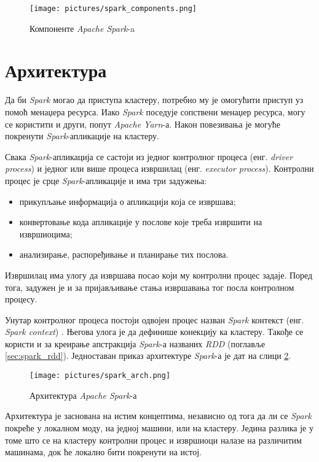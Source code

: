 \documentclass[12pt,oneside]{memoir}
\begin{document}
\begin{figure}[!ht]
  \centering
  \texttt{[image: pictures/spark\_components.png]}
  \caption{Компоненте \textit{Apache Spark}-a}
  \label{fig:spark_kompot}
\end{figure}

\section{Архитектура}
\label{sec:spark_arx}

Да би \textit{Spark} могао да приступа кластеру, потребно му је омогућити приступ уз помоћ менаџера ресурса. Иако \textit{Spark} поседује сопствени менаџер ресурса, могу се користити и други, попут \textit{Apache Yarn}-а. Након повезивања је могуће покренути \textit{Spark}-апликације на кластеру. 

Свака \textit{Spark}-апликација се састоји из једног контролног процеса (енг. \textit{driver process}) и једног или више процеса извршилац (енг. \textit{executor process}). Контролни процес је срце \textit{Spark}-апликације и има три задужења:

\begin{itemize}
	\item прикупљање информација о апликацији која се извршава;	
	\item конвертовање кода апликације у послове које треба извршити на извршиоцима;
	\item анализирање, распоређивање и планирање тих послова.
\end{itemize}

Извршилац има улогу да извршава посао који му контролни процес задаје. Поред тога, задужен је и за пријављивање стања извршавања тог посла контролном процесу. 

Унутар контролног процеса постоји одвојен процес назван \textit{Spark} контекст (енг. \textit{Spark context}) \cite{spark_guide}. Његова улога је да дефинише конекцију ка кластеру. Такође се користи и за креирање апстракција \textit{Spark}-а названих \textit{RDD} (поглавље \ref{sec:spark_rdd}). Једноставан приказ архитектуре \textit{Spark}-а је дат на слици \ref{fig:spark_arhtt}.

\begin{figure}[!ht]
  \centering
  \texttt{[image: pictures/spark\_arch.png]}
  \caption{Архитектура \textit{Apache Spark}-а}
  \label{fig:spark_arhtt}
\end{figure}

Архитектура је заснована на истим концептима, независно од тога да ли се \textit{Spark} покреће у локалном моду, на једној машини, или на кластеру. Једина разлика је у томе што се на кластеру контролни процес и извршиоци налазе на различитим машинама, док ће локално бити покренути на истој.
\end{document}
